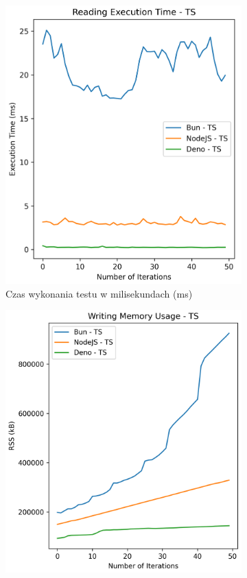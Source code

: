 \begin{figure}[H]
  \centering
  \begin{subfigure}[b]{0.44\textwidth}
    \centering
    \includegraphics[width=\textwidth]{Figures/files/files_writing_50_2000_50_ts_time.png}
    \caption{Czas wykonania testu w milisekundach (ms)}
    \label{fig:file_e2_writing_ts_time}
  \end{subfigure}
  \begin{subfigure}[b]{0.44\textwidth}
    \centering
    \includegraphics[width=\textwidth]{Figures/files/files_writing_50_2000_50_ts_memory.png}

\end{subfigure}
\end{figure}
